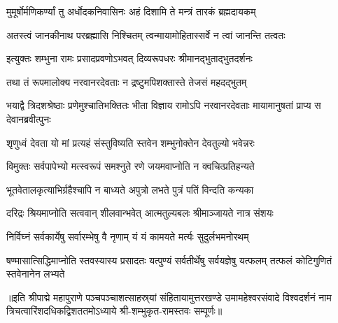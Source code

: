 \twolineshloka
{मुमूर्षोर्मणिकर्ण्यां तु अर्धोदकनिवासिनः}
{अहं दिशामि ते मन्त्रं तारकं ब्रह्मदायकम्}%

\twolineshloka
{अतस्त्वं जानकीनाथ परब्रह्मासि निश्चितम्}
{त्वन्मायामोहितास्सर्वे न त्वां जानन्ति तत्वतः}%


\twolineshloka
{इत्युक्तः शम्भुना रामः प्रसादप्रवणोऽभवत्}
{दिव्यरूपधरः श्रीमानद्भुताद्भुतदर्शनः}%

\twolineshloka
{तथा तं रूपमालोक्य नरवानरदेवताः}
{न द्रष्टुमपिशक्तास्ते तेजसं महदद्भुतम्}%

\threelineshloka
{भयाद्वै त्रिदशश्रेष्ठाः प्रणेमुश्चातिभक्तितः}%
{भीता विज्ञाय रामोऽपि नरवानरदेवताः}
{मायामानुषतां प्राप्य स देवानब्रवीत्पुनः}%


\twolineshloka
{शृणुध्वं देवता यो मां प्रत्यहं संस्तुविष्यति}
{स्तवेन शम्भुनोक्तेन देवतुल्यो भवेन्नरः}%

\twolineshloka
{विमुक्तः सर्वपापेभ्यो मत्स्वरूपं समश्नुते}
{रणे जयमवाप्नोति न क्वचित्प्रतिहन्यते}%

\twolineshloka
{भूतवेतालकृत्याभिर्ग्रहैश्चापि न बाध्यते}
{अपुत्रो लभते पुत्रं पतिं विन्दति कन्यका}%

\twolineshloka
{दरिद्रः श्रियमाप्नोति सत्ववान् शीलवान्भवेत्}
{आत्मतुल्यबलः श्रीमाञ्जायते नात्र संशयः}%

\twolineshloka
{निर्विघ्नं सर्वकार्येषु सर्वारम्भेषु वै नृणाम्}
{यं यं कामयते मर्त्यः सुदुर्लभमनोरथम्}%

\threelineshloka
{षण्मासात्सिद्धिमाप्नोति स्तवस्यास्य प्रसादतः}
{यत्पुण्यं सर्वतीर्थेषु सर्वयज्ञेषु यत्फलम्}
{तत्फलं कोटिगुणितं स्तवेनानेन लभ्यते}%

॥इति श्रीपाद्मे महापुराणे पञ्चपञ्चाशत्साहस्र्यां संहितायामुत्तरखण्डे उमामहेश्वरसंवादे विश्वदर्शनं नाम त्रिचत्वारिंशदधिकद्विशततमोऽध्याये श्री-शम्भुकृत-रामस्तवः सम्पूर्णः॥


